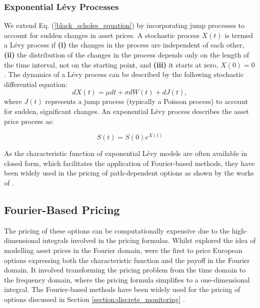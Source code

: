 \documentclass[a4paper]{report}
\begin{document}
\subsubsection{Exponential L\'evy Processes}
We extend Eq. (\ref{black_scholes_equation}) by incorporating jump processes to account for sudden changes in asset prices. A stochastic process $X(t)$ is termed a L\'evy process if \textbf{(i)} the changes in the process are independent of each other, \textbf{(ii)} the distribution of the changes in the process depends only on the length of the time interval, not on the starting point, and \textbf{(iii)} it starts at zero, $X(0) = 0$. The dynamics of a L\'evy process can be described by the following stochastic differential equation:
\begin{equation}
dX(t) = \mu dt + \sigma dW(t) + dJ(t),
\end{equation}
where $J(t)$ represents a jump process (typically a Poisson process) to account for sudden, significant changes. An exponential L\'evy process describes the asset price process as:

\begin{equation}
S(t) = S(0)e^{X(t)}	
\end{equation}

As the characteristic function of exponential L\'evy models are often available in closed form, which facilitates the application of Fourier-based methods, they have been widely used in the pricing of path-dependent options as shown by the works of \citet{fusai2016spitzer, kwok2011efficient, feng2008pricing, phelan2019hilbert}.

\subsection{Fourier-Based Pricing}
The pricing of these options can be computationally expensive due to the high-dimensional integrals involved in the pricing formulas. Whilst \citet{heston1993closed} explored the idea of modelling asset prices in the Fourier domain, \citet{carr1999option} were the first to price European options expressing both the characteristic function and the payoff in the Fourier domain. It involved transforming the pricing problem from the time domain to the frequency domain, where the pricing formula simplifies to a one-dimensional integral. The Fourier-based methods have been widely used for the pricing of options discussed in Section \ref{section:discrete_monitoring} \citep{eberlein2010analysis}.
\end{document}
